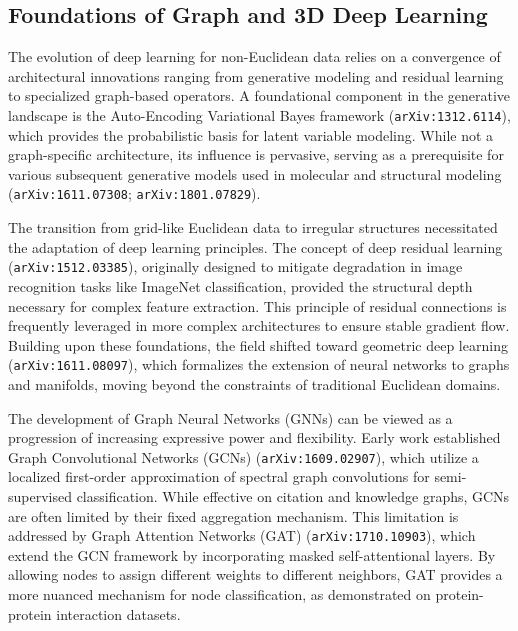 \documentclass[11pt]{article}
\begin{document}
\subsection{Foundations of Graph and 3D Deep Learning}

The evolution of deep learning for non-Euclidean data relies on a convergence of architectural innovations ranging from generative modeling and residual learning to specialized graph-based operators. A foundational component in the generative landscape is the Auto-Encoding Variational Bayes framework (\texttt{arXiv:1312.6114}), which provides the probabilistic basis for latent variable modeling. While not a graph-specific architecture, its influence is pervasive, serving as a prerequisite for various subsequent generative models used in molecular and structural modeling (\texttt{arXiv:1611.07308}; \texttt{arXiv:1801.07829}).

The transition from grid-like Euclidean data to irregular structures necessitated the adaptation of deep learning principles. The concept of deep residual learning (\texttt{arXiv:1512.03385}), originally designed to mitigate degradation in image recognition tasks like ImageNet classification, provided the structural depth necessary for complex feature extraction. This principle of residual connections is frequently leveraged in more complex architectures to ensure stable gradient flow. Building upon these foundations, the field shifted toward geometric deep learning (\texttt{arXiv:1611.08097}), which formalizes the extension of neural networks to graphs and manifolds, moving beyond the constraints of traditional Euclidean domains.

The development of Graph Neural Networks (GNNs) can be viewed as a progression of increasing expressive power and flexibility. Early work established Graph Convolutional Networks (GCNs) (\texttt{arXiv:1609.02907}), which utilize a localized first-order approximation of spectral graph convolutions for semi-supervised classification. While effective on citation and knowledge graphs, GCNs are often limited by their fixed aggregation mechanism. This limitation is addressed by Graph Attention Networks (GAT) (\texttt{arXiv:1710.10903}), which extend the GCN framework by incorporating masked self-attentional layers. By allowing nodes to assign different weights to different neighbors, GAT provides a more nuanced mechanism for node classification, as demonstrated on protein-protein interaction datasets.
\end{document}
